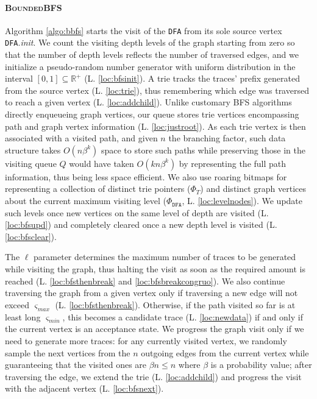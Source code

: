 \documentclass[acmengage]{acmart}
\newcommand{\smin}{\ensuremath{\varsigma_\textit{min}}}
\newcommand{\smax}{\ensuremath{\varsigma_\textit{max}}}
\begin{document}
\paragraph*{\textsc{BoundedBFS}}

Algorithm \ref{algo:bbfs} starts the visit of the \texttt{DFA} from its sole source vertex \texttt{DFA}.\textit{init}. We count the visiting depth levels of the graph starting from zero so that the number of depth levels reflects the number of traversed edges, and we initialize a pseudo-random number generator with uniform distribution in the interval $[0,1 ]\subseteq\mathbb{R}^+$ (L. \ref{loc:bfsinit}). A trie tracks the traces' prefix  generated from the source vertex (L. \ref{loc:trie}), thus remembering which edge was traversed to reach a given vertex (L. \ref{loc:addchild}). Unlike customary BFS algorithms directly enqueueing graph vertices, our queue  stores trie vertices encompassing path and graph vertex information (L. \ref{loc:justroot}). As each trie vertex is then associated with a visited path, and given $n$ the branching factor, such data structure takes $O(n\beta^k)$ space to store such paths while preserving those in the visiting queue $Q$ would have taken $O(kn\beta^k)$ by representing the full path information, thus being less space efficient. We also use roaring bitmaps \cite{WangLPS17} for representing a collection of distinct trie pointers ($\Phi_T$) and distinct graph vertices about the current maximum visiting level ($\Phi_\texttt{DFA}$, L. \ref{loc:levelnodes}). We update such levels once new vertices on the same level of depth are visited (L. \ref{loc:bfsupd}) and completely cleared once a new depth level is visited (L. \ref{loc:bfsclear}). 

The $\ell$ parameter determines the maximum number of traces to be generated while visiting the graph, thus halting the visit as soon as the required amount is reached (L. \ref{loc:bfsthenbreak} and \ref{loc:bfsbreakcongruo}). We also continue traversing the graph from a given vertex only if traversing a new edge will not exceed $\smax$ (L. \ref{loc:bfsthenbreak}). Otherwise, if the path visited so far is at least long $\smin$, this becomes a candidate trace (L. \ref{loc:newdata}) if and only if the current vertex is an acceptance state. We progress the graph visit only if we need to generate more traces: for any currently visited vertex, we randomly sample the next vertices from the $n$ outgoing edges from the current vertex while guaranteeing that the visited ones are $\beta n\leq n$ where $\beta$ is a probability value; after traversing the edge, we extend the trie (L. \ref{loc:addchild}) and progress the visit with the adjacent vertex (L. \ref{loc:bfsnext}). 
\end{document}
